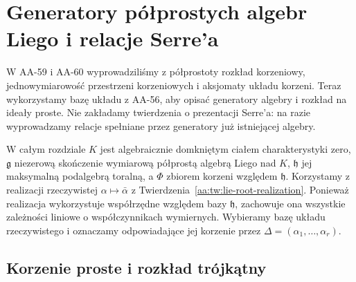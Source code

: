 \chapter[Generatory i relacje Serre'a]{Generatory półprostych algebr Liego i relacje Serre'a}
\label{aa:ch:lie-serre-relations}

W AA-59 i AA-60 wyprowadziliśmy z półprostoty rozkład korzeniowy, jednowymiarowość przestrzeni korzeniowych i aksjomaty układu korzeni. Teraz wykorzystamy bazę układu z AA-56, aby opisać generatory algebry i rozkład na ideały proste. Nie zakładamy twierdzenia o prezentacji Serre'a: na razie wyprowadzamy relacje spełniane przez generatory już istniejącej algebry.

W całym rozdziale $K$ jest algebraicznie domkniętym ciałem charakterystyki zero, $\mathfrak g$ niezerową skończenie wymiarową półprostą algebrą Liego nad $K$, $\mathfrak h$ jej maksymalną podalgebrą toralną, a $\Phi$ zbiorem korzeni względem $\mathfrak h$. Korzystamy z realizacji rzeczywistej $\alpha\mapsto\bar\alpha$ z Twierdzenia~\ref{aa:tw:lie-root-realization}. Ponieważ realizacja wykorzystuje współrzędne względem bazy $\mathfrak h$, zachowuje ona wszystkie zależności liniowe o współczynnikach wymiernych. Wybieramy bazę układu rzeczywistego i oznaczamy odpowiadające jej korzenie przez $\Delta=(\alpha_1,\ldots,\alpha_r)$.

\section{Korzenie proste i rozkład trójkątny}

